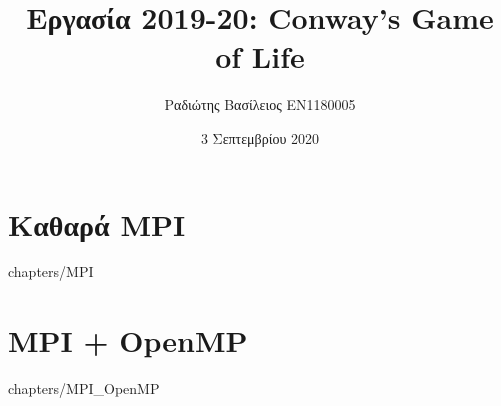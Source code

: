 \documentclass[a4paper,12pt]{report}
\title {Εργασία 2019-20: Conway’s Game of Life}
\author {Ραδιώτης Βασίλειος EN1180005}
\date {3 Σεπτεμβρίου 2020}
\begin{document}
\maketitle

\tableofcontents{}

\chapter {Καθαρά MPI}
     {chapters/MPI}

\chapter {MPI + OpenMP}
     {chapters/MPI_OpenMP}
\end{document}

